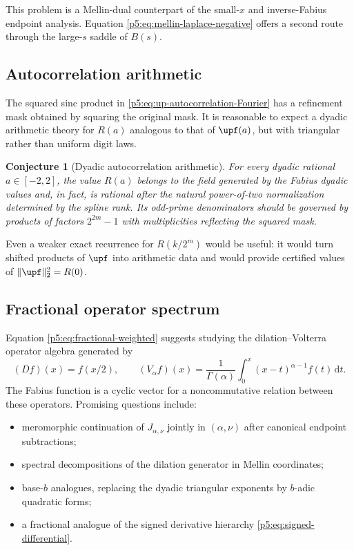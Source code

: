 \documentclass[11pt,oneside]{article}
\newtheorem{conjecture}[theorem]{Conjecture}
\theoremstyle{definition}
\theoremstyle{remark}
\newcommand{\dd}{\,\mathrm d}
\newcommand{\1}{\mathbf 1}
\begin{document}
This problem is a Mellin-dual counterpart of the small-$x$ and inverse-Fabius endpoint analysis.  Equation \eqref{p5:eq:mellin-laplace-negative} offers a second route through the large-$s$ saddle of $B(s)$.

\subsection{Autocorrelation arithmetic}

The squared sinc product in \eqref{p5:eq:up-autocorrelation-Fourier} has a refinement mask obtained by squaring the original mask.  It is reasonable to expect a dyadic arithmetic theory for $R(a)$ analogous to that of $\upf(a)$, but with triangular rather than uniform digit laws.

\begin{conjecture}[Dyadic autocorrelation arithmetic]\label{p5:conj:autocorrelation-rational}
For every dyadic rational $a\in[-2,2]$, the value $R(a)$ belongs to the field generated by the Fabius dyadic values and, in fact, is rational after the natural power-of-two normalization determined by the spline rank.  Its odd-prime denominators should be governed by products of factors $2^{2m}-1$ with multiplicities reflecting the squared mask.
\end{conjecture}

Even a weaker exact recurrence for $R(k/2^m)$ would be useful: it would turn shifted products of $\upf$ into arithmetic data and would provide certified values of $\|\upf\|_2^2=R(0)$.

\subsection{Fractional operator spectrum}

Equation \eqref{p5:eq:fractional-weighted} suggests studying the dilation--Volterra operator algebra generated by
\[
 (Df)(x)=f(x/2),
 \qquad
 (V_\alpha f)(x)=\frac1{\Gamma(\alpha)}
 \int_0^x(x-t)^{\alpha-1}f(t)\dd t.
\]
The Fabius function is a cyclic vector for a noncommutative relation between these operators.  Promising questions include:
\begin{itemize}
\item meromorphic continuation of $J_{\alpha,\nu}$ jointly in $(\alpha,\nu)$ after canonical endpoint subtractions;
\item spectral decompositions of the dilation generator in Mellin coordinates;
\item base-$b$ analogues, replacing the dyadic triangular exponents by $b$-adic quadratic forms;
\item a fractional analogue of the signed derivative hierarchy \eqref{p5:eq:signed-differential}.
\end{itemize}
\end{document}
